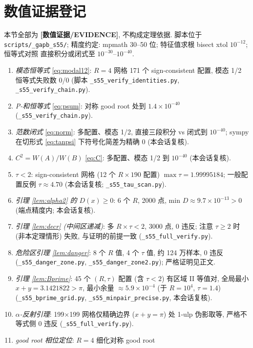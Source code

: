 \documentclass[UTF8]{ctexart}
\newcommand{\EVID}{\textbf{[数值证据/EVIDENCE]}}
\begin{document}
\section{数值证据登记}\label{sec:numerics}

本节全部为 \EVID, 不构成定理依据. 脚本位于 \texttt{scripts/\_gapb\_s55/};
精度约定: mpmath 30--50 位; 特征值求根 bisect xtol $10^{-12}$; 恒等式对照
直接积分或闭式至 $10^{-30}$--$10^{-40}$.

\begin{enumerate}
	\item \emph{模态恒等式} \eqref{eq:modal12}: $R=4$ 网格 171 个 sign-consistent
		配置, 模态 1/2 恒等式失败数 0/0 (脚本 \texttt{\_s55\_verify\_identities.py},
		\texttt{\_s55\_verify\_chain.py}).
	\item \emph{P-和恒等式} \eqref{eq:psum}: 对称 good root 处到 $1.4\times10^{-40}$
		(\texttt{\_s55\_verify\_chain.py}).
	\item \emph{范数闭式} \eqref{eq:norm}: 多配置、模态 1/2, 直接三段积分 vs
		闭式到 $10^{-40}$; sympy 在切形式 \eqref{eq:tanpsi} 下符号化简差为精确 0
		(本会话复核).
	\item \emph{$C^2=W(A)/W(B)$} \eqref{eq:C}: 多配置、模态 1/2 到 $10^{-40}$
		(本会话复核).
	\item \emph{$\tau<2$}: sign-consistent 网格 (12 个 $R\times190$ 配置)
		$\max\tau=1.99995184$; 一般配置反例 $\tau\approx4.70$ (本会话复核;
		\texttt{\_s55\_tau\_scan.py}).
	\item \emph{引理 \ref{lem:alpha2} 的 $D(x)\ge0$}: 6 个 $R$, 2000 点,
		min $D\approx9.7\times10^{-13}>0$ (端点精度内; 本会话复核).
	\item \emph{引理 \ref{lem:decr} (中间区递减)}: 多 $R\times\tau<2$, 3000 点,
		0 违反; 注意 $\tau\ge2$ 时 (非本定理情形) 失败, 与证明的前提一致
		(\texttt{\_s55\_full\_verify.py}).
	\item \emph{危险区引理 \ref{lem:danger}}: 8 个 $R$ 值, 4 个 $\tau$ 值, 约
		124 万样本, 0 违反 (\texttt{\_s55\_danger\_zone.py},
		\texttt{\_s55\_danger\_zone2.py}); 严格证明见正文.
	\item \emph{引理 \ref{lem:Bprime}}: 45 个 $(R,\tau)$ 配置 (含 $\tau<2$)
		有区域 II 等值对, 全局最小 $x+y=3.1421822>\pi$, 最小余量
		$\approx5.9\times10^{-4}$ (于 $R=10^4$, $\tau=1.4$)
		(\texttt{\_s55\_bprime\_grid.py}, \texttt{\_s55\_minpair\_precise.py},
		本会话复核).
	\item \emph{$\alpha$-反射引理}: 199$\times$199 网格仅精确边界
		($x+y=\pi$) 处 1-ulp 伪影取等, 严格不等式侧 0 违反
		(\texttt{\_s55\_full\_verify.py}).
	\item \emph{good root 相位定位}: $R=4$ 细化对称 good root

\end{enumerate}
\end{document}
